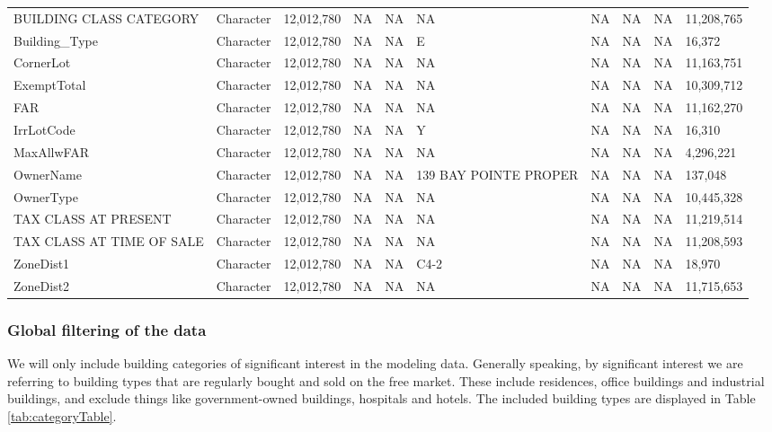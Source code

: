 \documentclass[12pt,]{article}
\begin{document}
\begin{table}
{\begin{tabular}[t]{llllllllll}
\addlinespace
BUILDING CLASS CATEGORY & Character & 12,012,780 & NA & NA & NA & NA & NA & NA & 11,208,765\\
Building\_Type & Character & 12,012,780 & NA & NA & E & NA & NA & NA & 16,372\\
CornerLot & Character & 12,012,780 & NA & NA & NA & NA & NA & NA & 11,163,751\\
ExemptTotal & Character & 12,012,780 & NA & NA & NA & NA & NA & NA & 10,309,712\\
FAR & Character & 12,012,780 & NA & NA & NA & NA & NA & NA & 11,162,270\\
\addlinespace
IrrLotCode & Character & 12,012,780 & NA & NA & Y & NA & NA & NA & 16,310\\
MaxAllwFAR & Character & 12,012,780 & NA & NA & NA & NA & NA & NA & 4,296,221\\
OwnerName & Character & 12,012,780 & NA & NA & 139 BAY POINTE PROPER & NA & NA & NA & 137,048\\
OwnerType & Character & 12,012,780 & NA & NA & NA & NA & NA & NA & 10,445,328\\
TAX CLASS AT PRESENT & Character & 12,012,780 & NA & NA & NA & NA & NA & NA & 11,219,514\\
\addlinespace
TAX CLASS AT TIME OF SALE & Character & 12,012,780 & NA & NA & NA & NA & NA & NA & 11,208,593\\
ZoneDist1 & Character & 12,012,780 & NA & NA & C4-2 & NA & NA & NA & 18,970\\
ZoneDist2 & Character & 12,012,780 & NA & NA & NA & NA & NA & NA & 11,715,653\\
\bottomrule
\end{tabular}}
\end{table}

\hypertarget{global-filtering-of-the-data}{%
\subsubsection{Global filtering of the
data}\label{global-filtering-of-the-data}}

We will only include building categories of significant interest in the
modeling data. Generally speaking, by significant interest we are
referring to building types that are regularly bought and sold on the
free market. These include residences, office buildings and industrial
buildings, and exclude things like government-owned buildings, hospitals
and hotels. The included building types are displayed in Table
\ref{tab:categoryTable}.
\end{document}
